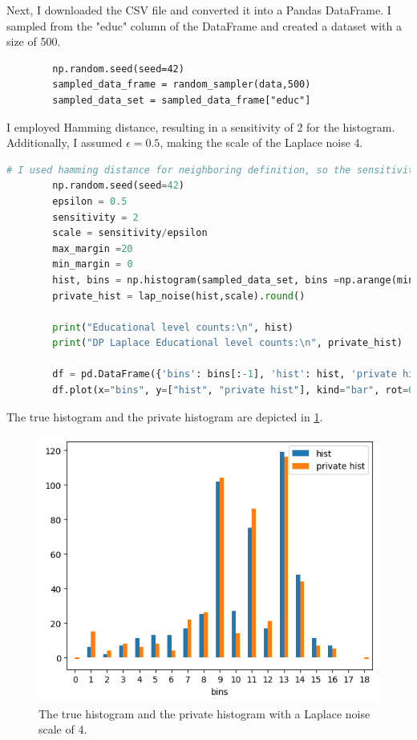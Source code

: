 \documentclass[12pt]{extarticle}
\begin{document}
	Next, I downloaded the CSV file and converted it into a Pandas DataFrame. I sampled from the "educ" column of the DataFrame and created a dataset with a size of 500.
	\begin{lstlisting}
		np.random.seed(seed=42)
		sampled_data_frame = random_sampler(data,500)
		sampled_data_set = sampled_data_frame["educ"]
	\end{lstlisting}
	I employed Hamming distance, resulting in a sensitivity of 2 for the histogram. Additionally, I assumed $\epsilon = 0.5$, making the scale of the Laplace noise 4. 
	\begin{lstlisting}[language=Python]	
		# I used hamming distance for neighboring definition, so the sensitivity of the histogram will be 2
		np.random.seed(seed=42)
		epsilon = 0.5
		sensitivity = 2
		scale = sensitivity/epsilon
		max_margin =20
		min_margin = 0
		hist, bins = np.histogram(sampled_data_set, bins =np.arange(min_margin,max_margin)) 
		private_hist = lap_noise(hist,scale).round()
		
		print("Educational level counts:\n", hist)
		print("DP Laplace Educational level counts:\n", private_hist)
		
		df = pd.DataFrame({'bins': bins[:-1], 'hist': hist, 'private hist': private_hist})
		df.plot(x="bins", y=["hist", "private hist"], kind="bar", rot=0)
	\end{lstlisting}
	The true histogram and the private histogram are depicted in \ref{fig:fig4}.
	\begin{figure}[h]
	\centering
	\includegraphics[width=1\textwidth]{im4.png}
	\caption{The true histogram and the private histogram with a Laplace noise scale of 4.}
	\label{fig:fig4}
	\end{figure}\\
\end{document}
